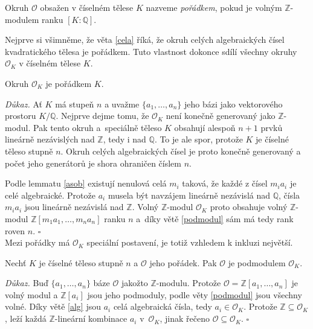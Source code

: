 \documentclass[12pt]{report}
\begin{document}
\begin{definice}
Okruh $\mathcal{O}$ obsažen v číselném tělese $K$ nazveme \textit{pořádkem}, pokud je volným $\mathbb{Z}$-modulem ranku $[K:\mathbb{Q}]$.
\end{definice}

Nejprve si všimněme, že věta \ref{cela} říká, že okruh celých algebraických čísel kvadratického tělesa je pořádkem. Tuto vlastnost dokonce sdílí všechny okruhy $\mathcal{O}_K$ v číselném tělese $K$.

\begin{veta}
Okruh $\mathcal{O}_K$ je pořádkem $K$.
\end{veta}
\noindent \textit{Důkaz.}  Ať $K$ má stupeň $n$ a uvažme $\lbrace a_1, \dots, a_n \rbrace$ jeho bázi jako vektorového prostoru $K/\mathbb{Q}$. Nejprve dejme tomu, že $\mathcal{O}_K$ není konečně generovaný jako $\mathbb{Z}$-modul. Pak tento okruh a~speciálně těleso $K$ obsahují alespoň $n+1$ prvků lineárně nezávislých nad $\mathbb{Z}$, tedy i nad $\mathbb{Q}$. To je ale spor, protože $K$ je číselné těleso stupně $n$. Okruh celých algebraických čísel je proto konečně generovaný a počet jeho generátorů je shora ohraničen číslem $n$.

Podle lemmatu \ref{asob} existují nenulová celá $m_i$ taková, že každé z čísel $m_i a_i$ je celé algebraické. Protože $a_i$ musela být navzájem lineárně nezávislá nad $\mathbb{Q}$, čísla $m_i a_i$ jsou lineárně nezávislá nad $\mathbb{Z}$. Volný $\mathbb{Z}$-modul $\mathcal{O}_K$ proto obsahuje volný $\mathbb{Z}$-modul $\mathbb{Z}[m_1 a_1,\dots, m_n a_n]$ ranku $n$ a~díky větě \ref{podmodul} sám má tedy rank roven $n$. \hfill $\square$\\

Mezi pořádky má $\mathcal{O}_K$ speciální postavení, je totiž vzhledem k inkluzi největší.

\begin{veta}\label{podporadek}
Nechť $K$ je číselné těleso stupně $n$ a $\mathcal{O}$ jeho pořádek. Pak $\mathcal{O}$ je podmodulem $\mathcal{O}_K$.
\end{veta}

\noindent \textit{Důkaz.} Buď $\lbrace a_1, \dots,a_n \rbrace$ báze $\mathcal{O}$ jakožto $\mathbb{Z}$-modulu. Protože $\mathcal{O} = \mathbb{Z}[a_1,\dots,a_n]$ je volný modul a $\mathbb{Z}[a_i]$ jsou jeho podmoduly, podle věty \ref{podmodul} jsou všechny volné. Díky větě \ref{alg} jsou $a_i$ celá algebraická čísla, tedy $a_i \in \mathcal{O}_K$. Protože $\mathbb{Z} \subseteq \mathcal{O}_K$, leží každá $\mathbb{Z}$-lineární kombinace $a_i$ v~$\mathcal{O}_K$, jinak řečeno $\mathcal{O} \subseteq \mathcal{O}_K$. \hfill $\square$\\
\end{document}
